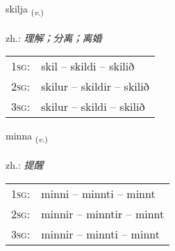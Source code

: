 \documentclass[frontgrid, backgrid]{flacards}\usepackage[]{graphicx}\usepackage[]{xcolor}
\begin{document}
\renewcommand{\flhead}{\vskip5pt \fboxsep=0pt {\small\bfseries\footnotesize Sagnorð | 动词}}
\renewcommand{\fcfoot}{\vskip5pt \fboxsep=0pt \hspace{2pt}{\small\bfseries\footnotesize 1K}}

\renewcommand{\blhead}{\vskip5pt {\small\bfseries\footnotesize Sagnorð | 动词 }}
\renewcommand{\bcfoot}{\vskip5pt \hspace{2pt}{\small\bfseries\footnotesize 1K}}


{skilja \small{\textsubscript{(\textit{v.})}} \\[1ex] %
\textphonetic{[scɪlja]} \\
zh.: \emph{理解；分离；离婚} \\  [2ex]
\renewcommand*{\arraystretch}{0.8}
\begin{tabular}{p{1cm}l}
\textsc{1sg}: & skil -- skildi -- skilið \\ 
\textsc{2sg}: & skilur -- skildir -- skilið \\ 
\textsc{3sg}: & skilur -- skildi -- skilið \\ 
\end{tabular}
}

\renewcommand{\flhead}{\vskip5pt \fboxsep=0pt {\small\bfseries\footnotesize Sagnorð | 动词}}
\renewcommand{\fcfoot}{\vskip5pt \fboxsep=0pt \hspace{2pt}{\small\bfseries\footnotesize 1K}}

\renewcommand{\blhead}{\vskip5pt {\small\bfseries\footnotesize Sagnorð | 动词 }}
\renewcommand{\bcfoot}{\vskip5pt \hspace{2pt}{\small\bfseries\footnotesize 1K}}


{minna \small{\textsubscript{(\textit{v.})}} \\[1ex] %
\textphonetic{[mɪna]} \\
zh.: \emph{提醒} \\  [2ex]
\renewcommand*{\arraystretch}{0.8}
\begin{tabular}{p{1cm}l}
\textsc{1sg}: & minni -- minnti -- minnt \\ 
\textsc{2sg}: & minnir -- minntir -- minnt \\ 
\textsc{3sg}: & minnir -- minnti -- minnt \\ 
\end{tabular}
}
\end{document}
